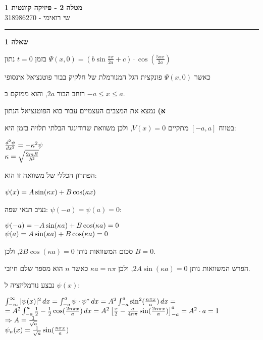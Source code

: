 \documentclass[14pt]{extarticle}
\makeatletter
\newenvironment{lefteqs}{%
    \begin{english}%
    \begin{flushleft}%
    \renewcommand{\arraystretch}{1.3}%
    $\begin{array}{@{}l@{}}%
}{%
    \end{array}$%
    \end{flushleft}%
    \end{english}%
}
\makeatother
\begin{document}
\begin{center}
    {\LARGE \textbf{מטלה 2 - פיזיקה קוונטית 1}}\\[0.5em]
    {\large שי רואימי - 318986270}\\[0.3em]
\end{center}

\hrule
\vspace{2em}

\textbf{\large שאלה 1}

בזמן $t=0$ נתון $\Psi(x,0)=(b\sin\frac{\pi x}{2a}+c)\cdot \cos(\frac{5\pi x}{2a})$

כאשר $\Psi(x,0)$ פונקצית הגל המנורמלת של חלקיק בבור פוטנציאל אינסופי

רוחב הבור $2a$, והוא ממוקם ב $-a \leq x \leq a$.

\textbf{א)}
נמצא את המצבים העצמיים עבור בוא הפוטנציאל הנתון

בטווח $[-a,a]$ מתקיים $V(x)=0$, ולכן משוואת שרודינגר הבלתי תלויה בזמן היא:

\begin{lefteqs}
    \frac{d^2 \psi}{dx^2} = -\kappa^2 \psi \\
    \kappa = \sqrt{\frac{2mE}{\hbar^2}}
\end{lefteqs}

הפתרון הכללי של משוואה זו הוא:
\begin{lefteqs}
    \psi(x) = A \sin(\kappa x) + B \cos(\kappa x)
\end{lefteqs}

נציב תנאי שפה: $\psi(-a)=\psi(a)=0$:
\begin{lefteqs}
    \psi(-a) = -A \sin(\kappa a) + B \cos(\kappa a) = 0 \\
    \psi(a) = A \sin(\kappa a) + B \cos(\kappa a) = 0
\end{lefteqs}
סכום המשוואות נותן $2B \cos(\kappa a)=0$, ולכן $B=0$.

הפרש המשוואות נותן $2A \sin(\kappa a)=0$, ולכן $\kappa a = n\pi$ כאשר $n$ הוא מספר שלם חיובי.

נבצע נורמליזציה ל $\psi(x)$:
\begin{lefteqs}
    \int_{-\infty}^{\infty} |\psi(x)|^2 \, dx = \int_{-a}^{a} \psi \cdot \psi^{*} \, dx =
    A^2 \int_{-a}^{a} \sin^2(\frac{n\pi x}{a}) \, dx = \\
    = A^2 \int_{-a}^{a} \frac{1}{2} - \frac{1}{2} \cos(\frac{2n\pi x}{a}) \, dx =
    A^2 \left[ \frac{x}{2} -\frac{a}{4n\pi} \sin(\frac{2n\pi x}{a}) \right]_{-a}^{a} = A^2 \cdot a = 1 \\
    \Rightarrow A = \frac{1}{\sqrt{a}} \\
    \psi_n(x) = \frac{1}{\sqrt{a}} \sin(\frac{n\pi x}{a})\
\end{lefteqs}
\end{document}
